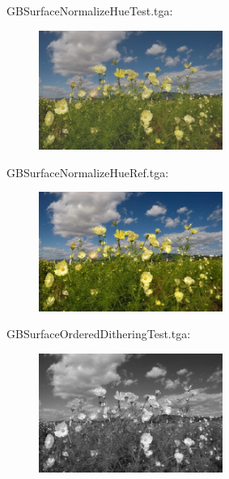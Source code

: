 GBSurfaceNormalizeHueTest.tga:\\
\begin{center}
\begin{figure}[H]
\centering\includegraphics[width=6cm]{./GBSurfaceNormalizeHueTest.png}\\
\end{figure}
\end{center}

GBSurfaceNormalizeHueRef.tga:\\
\begin{center}
\begin{figure}[H]
\centering\includegraphics[width=6cm]{./GBSurfaceNormalizeHueRef.png}\\
\end{figure}
\end{center}

GBSurfaceOrderedDitheringTest.tga:\\
\begin{center}
\begin{figure}[H]
\centering\includegraphics[width=6cm]{./GBSurfaceOrderedDitheringTest.png}\\
\end{figure}
\end{center}

